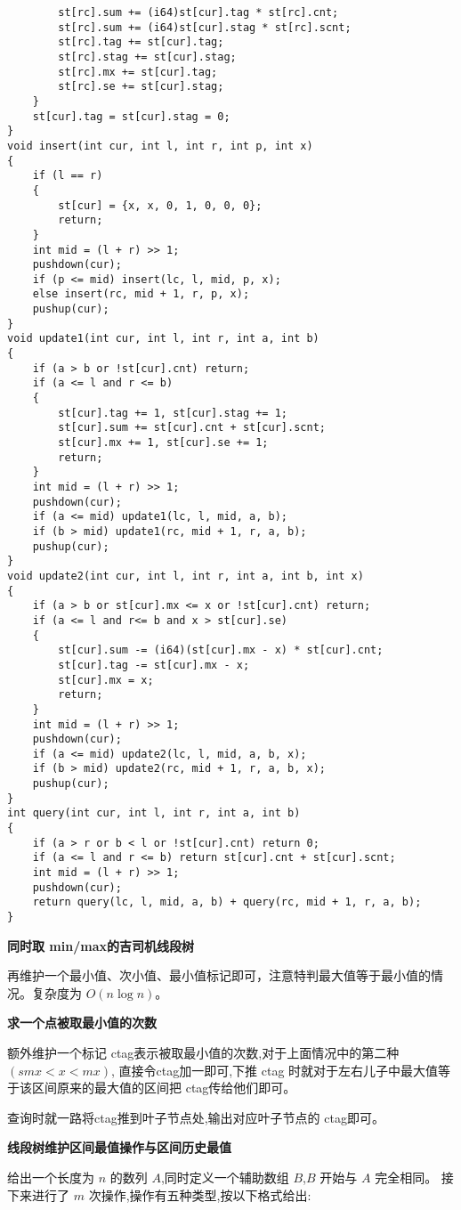 \documentclass[a4paper, fontset=none]{ctexart}
\begin{document}
\begin{verbatim}
        st[rc].sum += (i64)st[cur].tag * st[rc].cnt;
        st[rc].sum += (i64)st[cur].stag * st[rc].scnt;
        st[rc].tag += st[cur].tag;
        st[rc].stag += st[cur].stag;
        st[rc].mx += st[cur].tag;
        st[rc].se += st[cur].stag;
    }
    st[cur].tag = st[cur].stag = 0;
}
void insert(int cur, int l, int r, int p, int x)
{
    if (l == r)
    {
        st[cur] = {x, x, 0, 1, 0, 0, 0};
        return;
    }
    int mid = (l + r) >> 1;
    pushdown(cur);
    if (p <= mid) insert(lc, l, mid, p, x);
    else insert(rc, mid + 1, r, p, x);
    pushup(cur);
}
void update1(int cur, int l, int r, int a, int b)
{
    if (a > b or !st[cur].cnt) return;
    if (a <= l and r <= b)
    {
        st[cur].tag += 1, st[cur].stag += 1;
        st[cur].sum += st[cur].cnt + st[cur].scnt;
        st[cur].mx += 1, st[cur].se += 1;
        return;
    }
    int mid = (l + r) >> 1;
    pushdown(cur);
    if (a <= mid) update1(lc, l, mid, a, b);
    if (b > mid) update1(rc, mid + 1, r, a, b);
    pushup(cur);
}
void update2(int cur, int l, int r, int a, int b, int x)
{
    if (a > b or st[cur].mx <= x or !st[cur].cnt) return;
    if (a <= l and r<= b and x > st[cur].se)
    {
        st[cur].sum -= (i64)(st[cur].mx - x) * st[cur].cnt;
        st[cur].tag -= st[cur].mx - x;
        st[cur].mx = x;
        return;
    }
    int mid = (l + r) >> 1;
    pushdown(cur);
    if (a <= mid) update2(lc, l, mid, a, b, x);
    if (b > mid) update2(rc, mid + 1, r, a, b, x);
    pushup(cur);
}
int query(int cur, int l, int r, int a, int b)
{
    if (a > r or b < l or !st[cur].cnt) return 0;
    if (a <= l and r <= b) return st[cur].cnt + st[cur].scnt;
    int mid = (l + r) >> 1;
    pushdown(cur);
    return query(lc, l, mid, a, b) + query(rc, mid + 1, r, a, b);
}
\end{verbatim}

\textbf{同时取 min/max的吉司机线段树}

再维护一个最小值、次小值、最小值标记即可，注意特判最大值等于最小值的情况。复杂度为 $O(n\log n)$。

\textbf{求一个点被取最小值的次数}

额外维护一个标记 ctag表示被取最小值的次数,对于上面情况中的第二种$(smx < x<mx)$,
直接令ctag加一即可,下推 ctag 时就对于左右儿子中最大值等于该区间原来的最大值的区间把
ctag传给他们即可。

查询时就一路将ctag推到叶子节点处,输出对应叶子节点的 ctag即可。

\textbf{线段树维护区间最值操作与区间历史最值}

给出一个长度为 $n$ 的数列 $A$,同时定义一个辅助数组 $B$,$B$ 开始与 $A$ 完全相同。
接下来进行了 $m$ 次操作,操作有五种类型,按以下格式给出:
\end{document}
